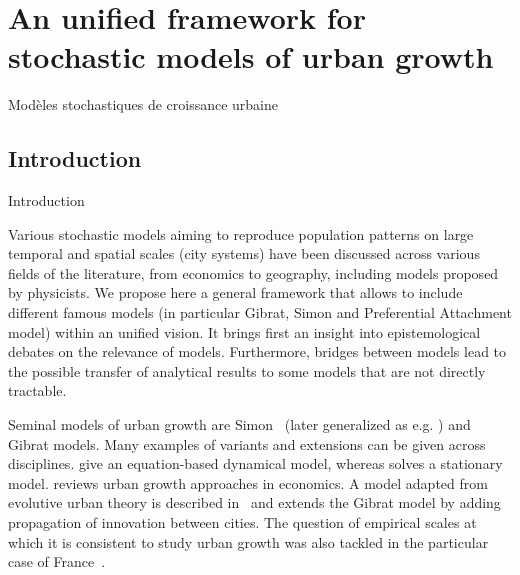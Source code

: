

\section{An unified framework for stochastic models of urban growth}{Modèles stochastiques de croissance urbaine}



\subsection{Introduction}{Introduction}



Various stochastic models aiming to reproduce population patterns on large temporal and spatial scales (city systems) have been discussed across various fields of the literature, from economics to geography, including models proposed by physicists. We propose here a general framework that allows to include different famous models (in particular Gibrat, Simon and Preferential Attachment model) within an unified vision. It brings first an insight into epistemological debates on the relevance of models. Furthermore, bridges between models lead to the possible transfer of analytical results to some models that are not directly tractable.


Seminal models of urban growth are Simon~\cite{simon1955class} (later generalized as e.g. \cite{haran1973modified}) and Gibrat models.
 Many examples of variants and extensions can be given across disciplines. \cite{benguigui2007dynamic} give an equation-based dynamical model, whereas \cite{gabaix1999zipf} solves a stationary model. \cite{Gabaix20042341} reviews urban growth approaches in economics. A model adapted from evolutive urban theory is described in~\cite{favaro2011gibrat} and extends the Gibrat model by adding propagation of innovation between cities. The question of empirical scales at which it is consistent to study urban growth was also tackled in the particular case of France~\cite{bretagnolle2002time}.




